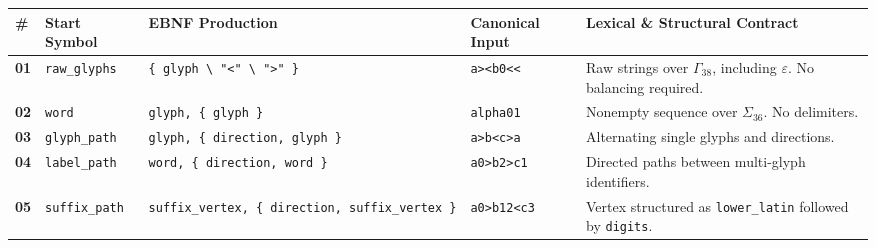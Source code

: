 \documentclass[
  11pt,
]{article}
\begin{document}
\begin{longtable}[]{@{}
  >{\raggedright\arraybackslash}p{}
  >{\raggedright\arraybackslash}p{}
  >{\raggedright\arraybackslash}p{}
  >{\raggedright\arraybackslash}p{}
  >{\raggedright\arraybackslash}p{}@{}}
\toprule\noalign{}
\begin{minipage}[b]{\linewidth}\raggedright
\#
\end{minipage} & \begin{minipage}[b]{\linewidth}\raggedright
Start Symbol
\end{minipage} & \begin{minipage}[b]{\linewidth}\raggedright
EBNF Production
\end{minipage} & \begin{minipage}[b]{\linewidth}\raggedright
Canonical Input
\end{minipage} & \begin{minipage}[b]{\linewidth}\raggedright
Lexical \& Structural Contract
\end{minipage} \\
\midrule\noalign{}
\endhead
\bottomrule\noalign{}
\endlastfoot
\textbf{01} & \nolinkurl{raw_glyphs} &
\texttt{\{\ glyph\ \textbackslash{}\textbar{}\ "\textless{}"\ \textbackslash{}\textbar{}\ "\textgreater{}"\ \}}
& \texttt{a\textgreater{}\textless{}b0\textless{}\textless{}} & Raw
strings over \(\Gamma_{38}\), including \(\varepsilon\). No balancing
required. \\
\textbf{02} & \nolinkurl{word} & \texttt{glyph,\ \{\ glyph\ \}} &
\nolinkurl{alpha01} & Nonempty sequence over \(\Sigma_{36}\). No
delimiters. \\
\textbf{03} & \nolinkurl{glyph_path} &
\texttt{glyph,\ \{\ direction,\ glyph\ \}} &
\texttt{a\textgreater{}b\textless{}c\textgreater{}a} & Alternating
single glyphs and directions. \\
\textbf{04} & \nolinkurl{label_path} &
\texttt{word,\ \{\ direction,\ word\ \}} &
\texttt{a0\textgreater{}b2\textgreater{}c1} & Directed paths between
multi-glyph identifiers. \\
\textbf{05} & \nolinkurl{suffix_path} &
\texttt{suffix\_vertex,\ \{\ direction,\ suffix\_vertex\ \}} &
\texttt{a0\textgreater{}b12\textless{}c3} & Vertex structured as
\nolinkurl{lower_latin} followed by \nolinkurl{digits}. \\

\end{longtable}
\end{document}
